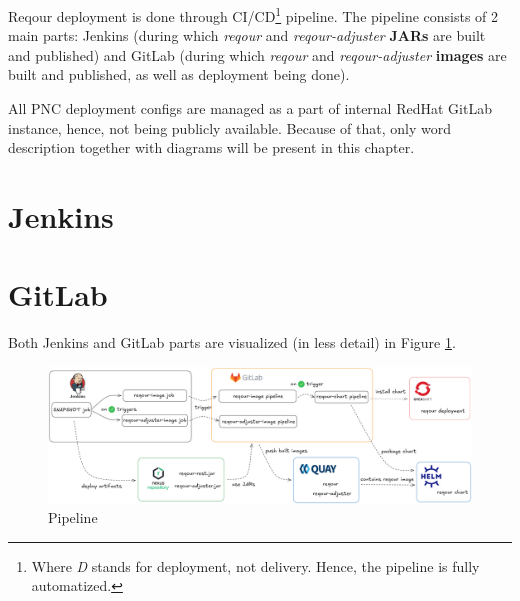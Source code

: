 \documentclass[../main.tex]{subfiles}
\begin{document}






Reqour deployment is done through CI/CD\footnote{Where \textit{D} stands for deployment, not delivery. Hence, the pipeline is fully automatized.} pipeline. The pipeline consists of 2 main parts: Jenkins (during which \textit{reqour} and \textit{reqour-adjuster} \textbf{JARs} are built and published) and GitLab (during which \textit{reqour} and \textit{reqour-adjuster} \textbf{images} are built and published, as well as deployment being done).

All PNC deployment configs are managed as a part of internal RedHat GitLab instance, hence, not being publicly available. Because of that, only word description together with diagrams will be present in this chapter.

\section{Jenkins}


\section{GitLab}


Both Jenkins and GitLab parts are visualized (in less detail) in Figure \ref{fig:pipeline}.

\begin{figure}
  \begin{center}
    \includegraphics[width=\textwidth]{images/pipeline.png}
  \end{center}
  \caption{Pipeline}
  \label{fig:pipeline}
\end{figure}
\end{document}
